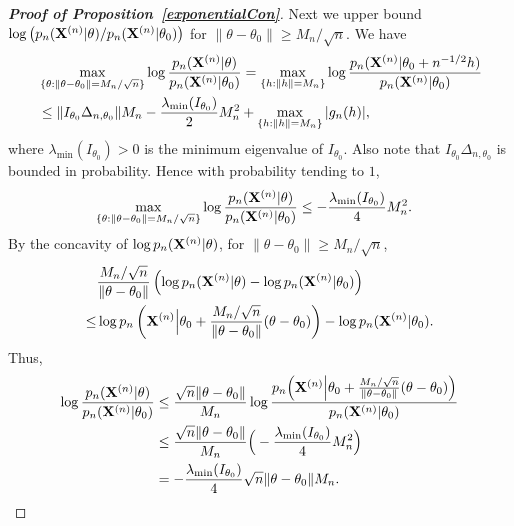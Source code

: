 \documentclass[11pt]{article}
\theoremstyle{plain}
\theoremstyle{definition}
\theoremstyle{remark}
\begin{document}
\begin{appendices}
\begin{proof}[\textbf{Proof of Proposition~\ref{exponentialCon}}]
Next we upper bound $\log \left(p_n(\mathbf{X}^{(n)}|\theta)/p_n(\mathbf{X}^{(n)}|\theta_0)\right)$ for $\|\theta-\theta_0\|\geq M_n/\sqrt{n}$.
    We have
    $$
    \begin{aligned}
        &\max_{\{\theta:\|\theta-\theta_0\|=M_n/\sqrt{n}\}}
    \log\frac{p_n(\mathbf{X}^{(n)}|\theta)}{p_n(\mathbf{X}^{(n)}|\theta_0)}
    =
    \max_{\{h:\|h\|=M_n\}}
    \log\frac{p_n(\mathbf{X}^{(n)}|\theta_0+n^{-1/2}h)}{p_n(\mathbf{X}^{(n)}|\theta_0)}
        \\
        &\leq
         \|I_{\theta_0}\Delta_{n,\theta_0}\| M_n -\frac{\lambda_{\min}(I_{\theta_0})}{2} M_n^2+
        \max_{\{h:\|h\|=M_n\}}|g_n(h)|,
    \end{aligned}
    $$
    where $\lambda_{\min}(I_{\theta_0})>0$ is the minimum eigenvalue of $I_{\theta_0}$.
    Also note that $I_{\theta_0}\Delta_{n,\theta_0}$ is bounded in probability. Hence with probability tending to $1$,
    $$
    \begin{aligned}
        &\max_{\{\theta:\|\theta-\theta_0\|=M_n/\sqrt{n}\}}
    \log\frac{p_n(\mathbf{X}^{(n)}|\theta)}{p_n(\mathbf{X}^{(n)}|\theta_0)}
        \leq 
        -\frac{\lambda_{\min}(I_{\theta_0})}{4}M_n^2.
    \end{aligned} 
    $$
    By the concavity of $\log p_n(\mathbf{X}^{(n)}|\theta)$, for $\|\theta-\theta_0\|\geq M_n/\sqrt{n}$,
    \begin{equation*}
        \begin{split}
     &\frac{M_n/\sqrt{n}}{\|\theta-\theta_0\|}
     \left(
     \log p_n(\mathbf{X}^{(n)}|\theta)-\log p_n(\mathbf{X}^{(n)}|\theta_0)
     \right)
     \\
     \leq&
     \log p_n \left(\mathbf{X}^{(n)}\Big|\theta_0+\frac{M_n/\sqrt{n}}{\|\theta-\theta_0\|}(\theta-\theta_0)\right)-\log p_n(\mathbf{X}^{(n)}|\theta_0).
        \end{split}
    \end{equation*}
    Thus,
    $$
    \begin{aligned}
     \log \frac{p_n(\mathbf{X}^{(n)}|\theta)}{ p_n(\mathbf{X}^{(n)}|\theta_0)}
        &\leq
        \frac{\sqrt{n}\|\theta-\theta_0\|}{M_n}
     \log \frac{p_n\Big(\mathbf{X}^{(n)}\Big|\theta_0+\frac{M_n/\sqrt{n}}{\|\theta-\theta_0\|}(\theta-\theta_0)\Big)}{ p_n(\mathbf{X}^{(n)}|\theta_0)}
        \\
        &\leq
        \frac{\sqrt{n}\|\theta-\theta_0\|}{M_n}
        \Big(-\frac{\lambda_{\min}(I_{\theta_0})}{4}M_n^2\Big)
        \\
        &=
        -\frac{\lambda_{\min}(I_{\theta_0})}{4}\sqrt{n}\|\theta-\theta_0\|
        M_n.
    \end{aligned}
$$
\end{proof}
\end{appendices}
\end{document}
